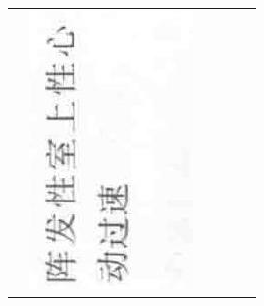 \documentclass[10pt]{article}
\begin{document}
\begin{center}
\begin{tabular}{|c|c|c|c|c|c|}
 & \includegraphics[max width=\textwidth]{2024_07_05_645bb794a4d4f32ee0c8g-352(10)}

\end{tabular}
\end{center}
\end{document}
